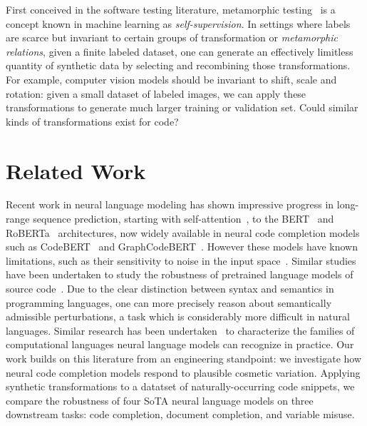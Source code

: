 \documentclass[usenames,dvipsnames]{article} %
\begin{document}
First conceived in the software testing literature, metamorphic testing~\cite{chen1995metamorphic} is a concept known in machine learning as \textit{self-supervision}. In settings where labels are scarce but invariant to certain groups of transformation or \textit{metamorphic relations}, given a finite labeled dataset, one can generate an effectively limitless quantity of synthetic data by selecting and recombining those transformations. For example, computer vision models should be invariant to shift, scale and rotation: given a small dataset of labeled images, we can apply these transformations to generate much larger training or validation set. Could similar kinds of transformations exist for code?

  \section{Related Work}\label{sec:related_work}

 Recent work in neural language modeling has shown impressive progress in long-range sequence prediction, starting with self-attention~\citep{vaswani2017attention}, to the BERT~\citep{devlin2018bert} and RoBERTa~\citep{liu2019roberta} architectures, now widely available in neural code completion models such as CodeBERT~\citep{feng2020codebert} and GraphCodeBERT~\citep{guo2021graphcodebert}. However these models have known limitations, such as their sensitivity to noise in the input space~\cite{sun2020adv}. Similar studies have been undertaken to study the robustness of pretrained language models of source code~\citep{bielik2020adversarial, zhou2021adversarial}. Due to the clear distinction between syntax and semantics in programming languages, one can more precisely reason about semantically admissible perturbations, a task which is considerably more difficult in natural languages. Similar research has been undertaken~\citep{weiss2018practical, chirkova2020empirical, chen2021evaluating} to characterize the families of computational languages neural language models can recognize in practice. Our work builds on this literature from an engineering standpoint: we investigate how neural code completion models respond to plausible cosmetic variation. Applying synthetic transformations to a datatset of naturally-occurring code snippets, we compare the robustness of four SoTA neural language models on three downstream tasks: code completion, document completion, and variable misuse. %
\end{document}
